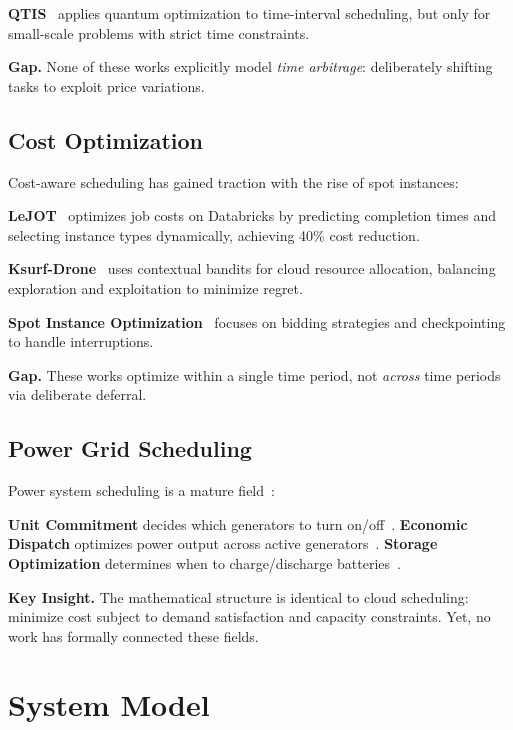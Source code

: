 \documentclass[10pt,conference]{IEEEtran}
\begin{document}
\textbf{QTIS}~\cite{tirado2025qtis} applies quantum optimization to time-interval scheduling, but only for small-scale problems with strict time constraints.

\textbf{Gap.} None of these works explicitly model \textit{time arbitrage}: deliberately shifting tasks to exploit price variations.

\subsection{Cost Optimization}

Cost-aware scheduling has gained traction with the rise of spot instances:

\textbf{LeJOT}~\cite{ma2025lejot} optimizes job costs on Databricks by predicting completion times and selecting instance types dynamically, achieving 40\% cost reduction.

\textbf{Ksurf-Drone}~\cite{dangana2025ksurf} uses contextual bandits for cloud resource allocation, balancing exploration and exploitation to minimize regret.

\textbf{Spot Instance Optimization}~\cite{wang2023spot,li2024bidding,zhang2025checkpointing} focuses on bidding strategies and checkpointing to handle interruptions.

\textbf{Gap.} These works optimize within a single time period, not \textit{across} time periods via deliberate deferral.

\subsection{Power Grid Scheduling}

Power system scheduling is a mature field~\cite{wood2013power}:

\textbf{Unit Commitment} decides which generators to turn on/off~\cite{padhy2004unit}.
\textbf{Economic Dispatch} optimizes power output across active generators~\cite{zhu2015optimization}.
\textbf{Storage Optimization} determines when to charge/discharge batteries~\cite{luo2015overview}.

\textbf{Key Insight.} The mathematical structure is identical to cloud scheduling: minimize cost subject to demand satisfaction and capacity constraints. Yet, no work has formally connected these fields.

\section{System Model}
\label{sec:model}
\end{document}
